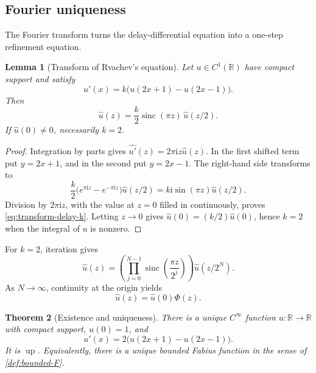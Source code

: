 \documentclass[11pt,oneside]{article}
\newtheorem{theorem}{Theorem}[section]
\newtheorem{lemma}[theorem]{Lemma}
\theoremstyle{definition}
\theoremstyle{remark}
\newcommand{\upf}{\operatorname{up}}
\newcommand{\sinc}{\operatorname{sinc}}
\newcommand{\ii}{\mathrm i}
\newcommand{\R}{\mathbb R}
\begin{document}
\subsection{Fourier uniqueness}

The Fourier transform turns the delay-differential equation into a one-step
refinement equation.

\begin{lemma}[Transform of Rvachev's equation]\label{lem:transform-delay}
Let $u\in C^1(\R)$ have compact support and satisfy
\[
  u'(x)=k\bigl(u(2x+1)-u(2x-1)\bigr).
\]
Then
\begin{equation}\label{eq:transform-delay-k}
  \widehat u(z)=\frac{k}{2}\sinc(\pi z)\,\widehat u(z/2).
\end{equation}
If $\widehat u(0)\ne0$, necessarily $k=2$.
\end{lemma}

\begin{proof}
Integration by parts gives
$\widehat{u'}(z)=2\pi\ii z\widehat u(z)$.  In the first shifted term put
$y=2x+1$, and in the second put $y=2x-1$.  The right-hand side transforms to
\[
  \frac{k}{2}\bigl(e^{\pi\ii z}-e^{-\pi\ii z}\bigr)\widehat u(z/2)
  =k\ii\sin(\pi z)\widehat u(z/2).
\]
Division by $2\pi\ii z$, with the value at $z=0$ filled in continuously, proves
\eqref{eq:transform-delay-k}.  Letting $z\to0$ gives
$\widehat u(0)=(k/2)\widehat u(0)$, hence $k=2$ when the integral of $u$ is nonzero.
\end{proof}

For $k=2$, iteration gives
\begin{equation}\label{eq:transform-iterate}
  \widehat u(z)=\left(\prod_{j=0}^{N-1}
  \sinc\left(\frac{\pi z}{2^j}\right)\right)\widehat u(z/2^N).
\end{equation}
As $N\to\infty$, continuity at the origin yields
\begin{equation}\label{eq:up-Fourier-product}
  \widehat u(z)=\widehat u(0)\Phi(z).
\end{equation}

\begin{theorem}[Existence and uniqueness]\label{thm:existence-uniqueness}
There is a unique $C^\infty$ function $u\colon\R\to\R$ with compact support,
$u(0)=1$, and
\begin{equation}\label{eq:unique-up-equation}
  u'(x)=2\bigl(u(2x+1)-u(2x-1)\bigr).
\end{equation}
It is $\upf$.  Equivalently, there is a unique bounded Fabius function in the
sense of \cref{def:bounded-F}.
\end{theorem}
\end{document}
